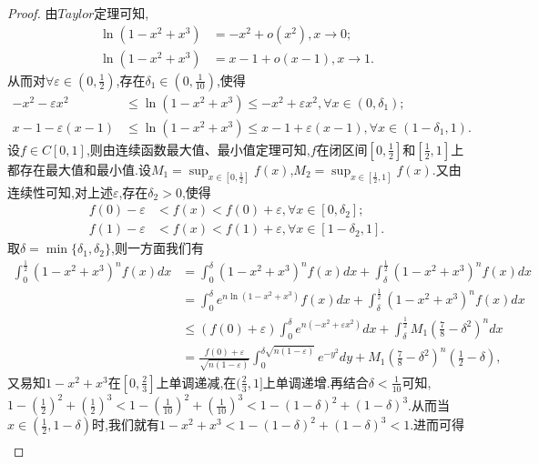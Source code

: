 \documentclass[../../main.tex]{subfiles}
\begin{document}
\begin{proof}
由\(Taylor\)定理可知,
\begin{align*}
\ln(1 - x^2 + x^3) &= -x^2 + o(x^2),  x\rightarrow 0;\\
\ln(1 - x^2 + x^3) &= x - 1 + o(x - 1),  x\rightarrow 1.
\end{align*}
从而对\(\forall \varepsilon \in (0,\frac{1}{2})\),存在\(\delta_1 \in (0,\frac{1}{10})\),使得
\begin{align*}
-x^2 - \varepsilon x^2&\leqslant\ln(1 - x^2 + x^3)\leqslant -x^2 + \varepsilon x^2, \forall x\in (0,\delta_1);\\
x - 1 - \varepsilon(x - 1)&\leqslant\ln(1 - x^2 + x^3)\leqslant x - 1 + \varepsilon(x - 1), \forall x\in (1 - \delta_1,1).
\end{align*}
设\(f\in C[0,1]\),则由连续函数最大值、最小值定理可知,\(f\)在闭区间\([0,\frac{1}{2}]\)和$[\frac{1}{2},1]$上都存在最大值和最小值.设\(M_1 = \sup_{x\in [0,\frac{1}{2}]}f(x)\),\(M_2 = \sup_{x\in [\frac{1}{2},1]}f(x)\).又由连续性可知,对上述\(\varepsilon\),存在\(\delta_2>0\),使得
\begin{align*}
f(0) - \varepsilon&< f(x) < f(0) + \varepsilon, \forall x\in [0,\delta_2];\\
f(1) - \varepsilon&< f(x) < f(1) + \varepsilon, \forall x\in [1 - \delta_2,1].
\end{align*}
取\(\delta = \min\{\delta_1,\delta_2\}\),则一方面我们有
\begin{align*}
\int_0^{\frac{1}{2}}{(1 - x^2 + x^3)^nf(x)dx}&=\int_0^{\delta}{(1 - x^2 + x^3)^nf(x)dx}+\int_{\delta}^{\frac{1}{2}}{(1 - x^2 + x^3)^nf(x)dx}\\
&=\int_0^{\delta}{e^{n\ln(1 - x^2 + x^3)}f(x)dx}+\int_{\delta}^{\frac{1}{2}}{(1 - x^2 + x^3)^nf(x)dx}\\
&\leqslant (f(0) + \varepsilon)\int_0^{\delta}{e^{n(-x^2 + \varepsilon x^2)}dx}+\int_{\delta}^{\frac{1}{2}}{M_1\left(\frac{7}{8}-\delta^2\right)^ndx}\\
&=\frac{f(0) + \varepsilon}{\sqrt{n(1 - \varepsilon)}}\int_0^{\delta\sqrt{n(1 - \varepsilon)}}{e^{-y^2}dy}+M_1\left(\frac{7}{8}-\delta^2\right)^n\left(\frac{1}{2}-\delta\right),
\end{align*}
又易知$1-x^2+x^3$在$[0,\frac{2}{3}]$上单调递减,在$(\frac{2}{3},1]$上单调递增.再结合$\delta<\frac{1}{10}$可知,$1-(\frac{1}{2})^2+(\frac{1}{2})^3<1-(\frac{1}{10})^2+(\frac{1}{10})^3<1-(1-\delta)^2+(1-\delta)^3$.从而当$x\in (\frac{1}{2},1-\delta)$时,我们就有$1-x^2+x^3<1-(1-\delta)^2+(1-\delta)^3<1$.进而可得
\begin{align*}

\end{align*}
\end{proof}
\end{document}
